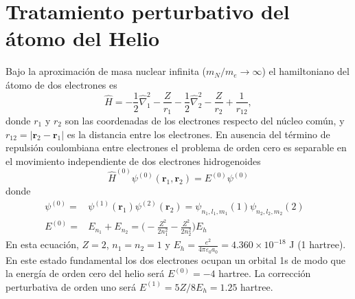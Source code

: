
\section{Tratamiento perturbativo del átomo del Helio}
Bajo la aproximación de masa nuclear infinita ($m_N/m_e\rightarrow \infty$)
el hamiltoniano del átomo de dos electrones es
\begin{equation}
    \hat{H} = -\frac{1}{2}\hat{\nabla}^2_1 - \frac{Z}{r_1} 
            -\frac{1}{2}\hat{\nabla}^2_2 - \frac{Z}{r_2} + \frac{1}{r_{12}},
\end{equation}
donde $r_1$ y $r_2$ son las coordenadas de los electrones respecto 
del núcleo común, y $r_{12}=|\mathbf{r}_2 - \mathbf{r}_1|$ es la
distancia entre los electrones. En ausencia del término de repulsión 
coulombiana entre electrones el problema de orden cero es separable
en el movimiento independiente de dos electrones hidrogenoides
\begin{equation}
    \hat{H}^{(0)}\psi^{(0)}(\mathbf{r}_1,\mathbf{r}_2) = E^{(0)}\psi^{(0)}
\end{equation}
donde
\begin{align}
    \psi^{(0)} = & \psi^{(1)}(\mathbf{r}_1) \psi^{(2)}(\mathbf{r}_2) = \psi_{n_1, l_1, m_1}(1)\psi_{n_2, l_2, m_2}(2)\\
    E^{(0)} = & E_{n_1} + E_{n_2} = \bigg(-\frac{Z^2}{2n_1^2} -\frac{Z^2}{2n_2^2}\bigg)E_h&
\end{align}
En esta ecuación, $Z=2$, $n_1=n_2=1$ y $E_h=\frac{e^2}{4\pi \varepsilon_0 a_0}=4.360\times 10^{-18}$ J (1 hartree).
En este estado fundamental los dos electrones ocupan un orbital 1s de modo
que la energía de orden cero del helio será $E^{(0)}=-4$ hartree. La 
corrección perturbativa de orden uno será 
$E^{(1)}=5Z/8E_h=1.25$ hartree.